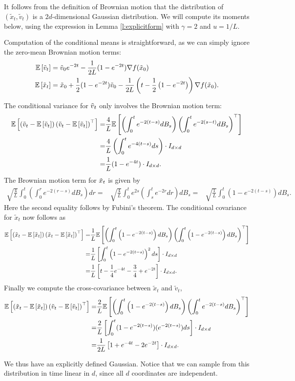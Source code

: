 \begin{Proof}%
It follows from the definition of Brownian motion that the distribution of $(\tilde{x}_t,\tilde{v}_t)$ is a $2d$-dimensional Gaussian distribution. We will compute its moments below, using the expression in Lemma \ref{l:explicitform} with $\gamma=2$ and $u=1/L$.


Computation of the conditional means is straightforward, as we can simply ignore the zero-mean Brownian motion terms:
\begin{align}
\mathbb{E}\left[\tilde{v}_t \right] & = \tilde{v}_0 e^{-2 t} - \frac{1}{2L}(1-e^{-2 t}) \nabla f(\tilde{x}_0)\\
\mathbb{E}\left[\tilde{x}_t \right] & = \tilde{x}_0 + \frac{1}{2}(1-e^{-2 t})\tilde{v}_0 - \frac{1}{2L} \left( t - \frac{1}{2}\left(1-e^{-2 t}\right) \right) \nabla f(\tilde{x}_0).
\end{align}

The conditional variance for $\tilde{v}_t$ only involves the Brownian motion term:
\begin{align*}
\mathbb{E}\left[\left(\tilde{v}_t - \mathbb{E}\left[\tilde{v}_t\right]\right) \left(\tilde{v}_t - \mathbb{E}\left[\tilde{v}_t\right]\right)^{\top} \right]=& \frac{4}{L}\mathbb{E}\left[\left(\int_0^t e^{-2 (t-s)} dB_s\right)\left(\int_0^t e^{-2(s-t)} dB_s\right)^{\top}\right]\\
=& \frac{4}{L} \left(\int_0^t e^{-4(t-s)} ds \right) \cdot I_{d\times d}\\
=& \frac{1}{L}(1-e^{-4 t})\cdot I_{d\times d}.
\end{align*}
The Brownian motion term for $\tilde{x}_t$ is given by
\begin{align*}
\sqrt{\frac{4}{L}} \int_0^t  \left( \int_0^r e^{-2 (r-s)} dB_s \right)dr
=& \sqrt{\frac{4}{L}} \int_0^t e^{2s}\left( \int_s^t e^{-2r} dr \right) dB_s=& \sqrt{\frac{1}{L}} \int_0^t \left(1-e^{-2(t-s)} \right) dB_s.
\end{align*}
Here the second equality follows by Fubini's theorem. The conditional covariance  for $\tilde{x}_t$ now follows as 
\begin{align*}
\mathbb{E}\left[\left(\tilde{x}_t - \mathbb{E}\left[\tilde{x}_t\right]\right) \left(\tilde{x}_t - \mathbb{E}\left[\tilde{x}_t\right]\right)^{\top} \right]=& \frac{1}{L } \mathbb{E}\left[\left( \int_0^t \left(1- e^{-2(t-s)}  \right)dB_s\right)\left( \int_0^t \left(1-e^{-2(t-s)} \right)dB_s\right)^{\top}\right]\\
=& \frac{1}{L } \left[ \int_0^t \left(1-e^{-2(t-s)}\right )^2 ds \right]\cdot I_{d \times d}\\
=& \frac{1}{L } \left[t-\frac{1}{4}e^{-4t}-\frac{3}{4}+e^{-2t}\right] \cdot I_{d\times d}.
\end{align*}
Finally we compute the cross-covariance between $\tilde{x}_t$ and $\tilde{v}_t$,
\begin{align*}
\mathbb{E}\left[\left(\tilde{x}_t - \mathbb{E}\left[\tilde{x}_t\right]\right) \left(\tilde{v}_t - \mathbb{E}\left[\tilde{v}_t\right]\right)^{\top}\right]=& \frac{2}{L} \mathbb{E}\left[\left( \int_0^t\left(1-e^{-2 (t-s)} \right)dB_s\right)\left( \int_0^t e^{-2 (t-s)} dB_s\right)^{\top}\right]\\
=& \frac{2}{L} \left[ \int_0^t(1-e^{-2 (t-s)})(e^{-2 (t-s)}) ds \right]\cdot I_{d \times d}\\
=& \frac{1}{2L} \left[1+e^{-4t}-2e^{-2t}\right] \cdot I_{d \times d}.
\end{align*}

We thus have an explicitly defined Gaussian. Notice that we can sample from this distribution in time linear in $d$, since all $d$ coordinates are independent.
\end{Proof}